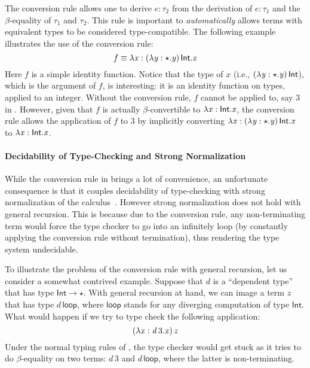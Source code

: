 
The conversion rule allows one to derive $e:\tau_{{\mathrm{2}}}$ from the
derivation of $e:\tau_{{\mathrm{1}}}$ and the $\beta$-equality of $\tau_{{\mathrm{1}}}$ and
$\tau_{{\mathrm{2}}}$. This rule is important to \emph{automatically} allows terms
with equivalent types to be considered type-compatible.  The following
example illustrates the use of the conversion rule:
\[
f \equiv \lambda  \mathit{x}  :  (  \lambda  \mathit{y}  :  \star  .  \mathit{y}  ) \, \mathsf{Int}  .  \mathit{x}
\]
Here $f$ is a simple identity function. Notice that the type of $x$
(i.e., $(  \lambda  \mathit{y}  :  \star  .  \mathit{y}  ) \, \mathsf{Int}$), which is the argument of $f$, is
interesting: it is an identity function on types, applied to an
integer.  Without the conversion rule, $f$ cannot be applied to, say
$3$ in \coc. However, given that $f$ is actually $\beta$-convertible
to $\lambda  \mathit{x}  :  \mathsf{Int}  .  \mathit{x}$, the conversion rule allows the application of $f$
to $3$ by implicitly converting $\lambda  \mathit{x}  :  (  \lambda  \mathit{y}  :  \star  .  \mathit{y}  ) \, \mathsf{Int}  .  \mathit{x}$ to
$\lambda  \mathit{x}  :  \mathsf{Int}  .  \mathit{x}$.

\paragraph{Decidability of Type-Checking and Strong Normalization}
While the conversion rule in \coc brings a lot of convenience, an
unfortunate consequence is that it couples decidability of
type-checking with strong normalization of the
calculus~\cite{coc:decidability}.  However strong normalization does
not hold with general recursion. This is because due to the conversion
rule, any non-terminating term would force the type checker to go into
an infinitely loop (by constantly applying the conversion rule without
termination), thus rendering the type system undecidable.

To illustrate the problem of the conversion rule with general
recursion, let us consider a somewhat contrived example. Suppose that
$d$ is a ``dependent type'' that has type $\mathsf{Int}  \rightarrow  \star$. With
general recursion at hand, we can image a term $z$ that has type
$d\,\mathsf{loop}$, where $\mathsf{loop}$ stands for any diverging
computation of type $ \mathsf{Int} $. What would happen if we try to type
check the following application: \[ (  \lambda  \mathit{x}  :  \mathit{d} \, 3  .  \mathit{x}  ) \, \mathit{z}\]
Under the normal typing rules of \coc, the type checker would get
stuck as it tries to do $\beta$-equality on two terms: $d\,3$ and
$d\,\mathsf{loop}$, where the latter is non-terminating.   

